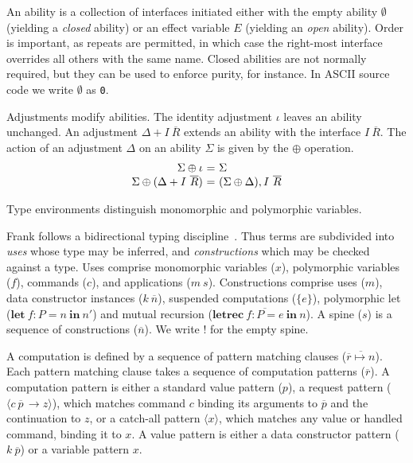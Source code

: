 \documentclass[12pt]{article}
\makeatletter
\newcommand{\many}{\overline}
\newcommand\ba{\begin{array}}
\newcommand\ea{\end{array}}
\newenvironment{equations}{\[\ba{@{}r@{~}c@{~}l@{}}}{\ea\]\ignorespacesafterend}
\newcommand{\sig}{I}
\newcommand{\sigs}{\Sigma}
\newcommand{\key}[1]{\textbf{#1}} %
\newcommand{\handleSymbol}{\rightarrow}
\newcommand{\handle}[2]{{#1} \handleSymbol {#2}}
\newcommand{\thunk}[1]{\{{#1}\}}
\newcommand{\adj}{\Delta}
\newcommand{\ev}{E}
\newcommand{\effin}[1]{\langle {#1} \rangle}
\newcommand{\id}{\iota}
\makeatother
\begin{document}
An ability is a collection of interfaces initiated either with the
empty ability $\emptyset$ (yielding a \emph{closed} ability) or an
effect variable $\ev$ (yielding an \emph{open} ability). Order is
important, as repeats are permitted, in which case the right-most
interface overrides all others with the same name.
%
Closed abilities are not normally required, but they can be used to
enforce purity, for instance. In ASCII source code we write
$\emptyset$ as \verb!0!.

Adjustments modify abilities. The identity adjustment $\id$ leaves an
ability unchanged. An adjustment $\adj + \sig~\many{R}$ extends an
ability with the interface $\sig~\many{R}$. The action of an
adjustment $\Delta$ on an ability $\sigs$ is given by the $\oplus$
operation.
%
\begin{equations}
\sigs \oplus \id                    &=& \sigs \\
\sigs \oplus (\adj + \sig~\many{R}) &=& (\sigs \oplus \adj), \sig~\many{R} \\
\end{equations}
%

Type environments distinguish monomorphic and polymorphic variables.

Frank follows a bidirectional typing discipline~\cite{PierceT00}. Thus
terms are subdivided into \emph{uses} whose type may be inferred, and
\emph{constructions} which may be checked against a type. Uses
comprise monomorphic variables ($x$), polymorphic variables ($f$),
commands ($c$), and applications ($m~s$). Constructions comprise uses
($m$), data constructor instances ($k~\many{n}$), suspended
computations ($\thunk{e}$), polymorphic let ($\key{let}~f : P =
n~\key{in}~n'$) and mutual recursion ($\key{letrec}~\many{f : P =
  e}~\key{in}~n$).
%
A spine ($s$) is a sequence of constructions ($\many{n}$). We write
$!$ for the empty spine.

A computation is defined by a sequence of pattern matching clauses
($\many{\many{r} \mapsto n}$).
%
Each pattern matching clause takes a sequence of computation patterns
($\many{r}$). A computation pattern is either a standard value pattern
($p$), a request pattern ($\effin{\handle{c~\many{p}\,}{z}}$), which
matches command $c$ binding its arguments to $\many{p}$ and the
continuation to $z$, or a catch-all pattern $\effin{x}$, which matches
any value or handled command, binding it to $x$.
%
A value pattern is either a data constructor pattern ($k~\many{p}$) or
a variable pattern $x$.
\end{document}

